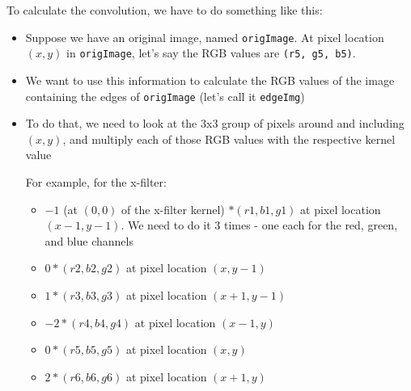 \documentclass{article}
\begin{document}
\begin{itemize}
          \iffalse
              The y-filter is:

              \begin{center}
                  \texttt{[image: sobel\_y.png]}
              \end{center}
          \fi

          To calculate the convolution, we have to do something like this:
          \renewcommand{\labelitemii}{$\bullet$}
          \renewcommand{\labelitemiii}{$\bullet$}
          \begin{itemize}

              \item Suppose we have an original image, named \texttt{origImage}.  At pixel location $(x, y)$ in \texttt{origImage}, let’s say the RGB values are \texttt{(r5, g5, b5)}.

              \item We want to use this information to calculate the RGB values of the image containing the edges of \texttt{origImage} (let’s call it \texttt{edgeImg})

              \item To do that, we need to look at the 3x3 group of pixels around and including $(x, y)$, and multiply each of those RGB values with the respective kernel value


                    For example, for the x-filter:

                    \begin{itemize}


                        \item $-1$ (at $(0, 0)$ of the x-filter kernel) $* (r1, b1, g1)$ at pixel location $(x-1, y-1)$. We need to do it 3 times - one each for the red, green, and blue channels

                        \item $0 * (r2, b2, g2)$ at pixel location $(x, y-1)$

                        \item $1 * (r3, b3, g3)$ at pixel location $(x+1, y-1)$

                        \item $-2 * (r4, b4, g4)$ at pixel location $(x-1, y)$

                        \item $0 * (r5, b5, g5)$ at pixel location $(x, y)$

                        \item $2 * (r6, b6, g6)$ at pixel location $(x+1, y)$


\end{itemize}
\end{itemize}
\end{itemize}
\end{document}
